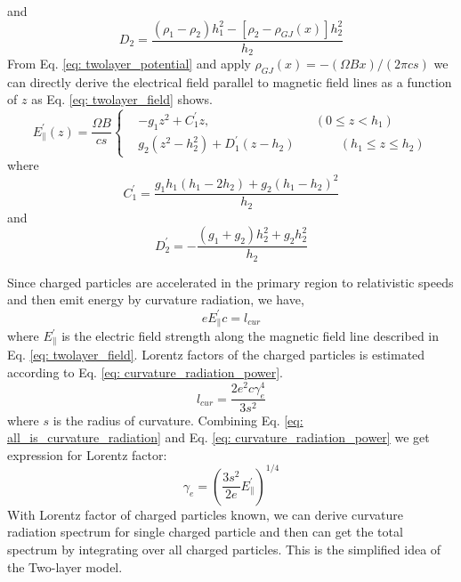 \documentclass[12pt]{report}
\begin{document}
      and 
      \begin{equation*}
        D_{2} = \frac{\left(\rho_1-\rho_2\right)h_1^2-\left[\rho_2-\rho_{GJ}\left(x\right)\right]h_2^2}{h_2}
      \end{equation*}
      From Eq. \ref{eq: twolayer_potential} and apply 
      $\rho_{GJ}\left(x\right)=-\left(\Omega B x\right)/\left(2\pi cs\right)$ 
      we can directly derive the electrical field parallel to magnetic field lines as a 
      function of $z$ as Eq. \ref{eq: twolayer_field} shows.
      \begin{equation}
        \label{eq: twolayer_field}
          E^{\prime}_{\parallel}\left(z\right) = \frac{\Omega B}{cs}
          \left\{\begin{alignedat}{2}
             & -g_1 z^2 + C_1^{\prime}z ,  &&\left(0 \leq z < h_{1}\right) \\
             & g_2\left(z^2 - h_2^2\right) + D_1^{\prime}\left(z-h_2\right)  &&\qquad \left(h_{1} \leq z \leq h_{2}\right) 
          \end{alignedat}\right.
      \end{equation}
      where 
      \begin{equation*}
        C_{1}^{\prime} = \frac{g_1 h_1 \left(h_1 - 2h_2\right)+ g_2\left(h_1-h_2\right)^2}{h_2}  
      \end{equation*}
      and 
      \begin{equation*}
        D_{2}^{\prime} = -\frac{\left(g_1 + g_2\right)h_2^2 + g_2 h_2^2}{h_2}
      \end{equation*}

      Since charged particles are accelerated in the primary region to relativistic speeds 
      and then emit energy by curvature radiation, we have,
      \begin{equation}
        \label{eq: all_is_curvature_radiation}
        e E_{\parallel}^{\prime} c = l_{cur}
      \end{equation}
      where $E_\parallel^{\prime}$ is the electric field strength along the magnetic field 
      line described in Eq. \ref{eq: twolayer_field}.
      Lorentz factors of the charged particles is estimated according to Eq. 
      \ref{eq: curvature_radiation_power}.
      \begin{equation}
        \label{eq: curvature_radiation_power}
        l_{cur} = \frac{2 e^2 c \gamma^{4}_{e}}{3s^2}
      \end{equation}      
      where $s$ is the radius of curvature. 
      Combining Eq. \ref{eq: all_is_curvature_radiation} and Eq.
      \ref{eq: curvature_radiation_power} we get expression for Lorentz factor: 
      \begin{equation}
        \label{eq: gamma_can_be_zero}
        \gamma_{e} = \left(\frac{3s^2}{2e} E_{\parallel}^{\prime}\right)^{1/4}
      \end{equation}
      With Lorentz factor of charged particles known, we can derive curvature radiation 
      spectrum for single charged particle and then can get the total spectrum by integrating 
      over all charged particles. This is the simplified idea of the Two-layer model. 
\end{document}
